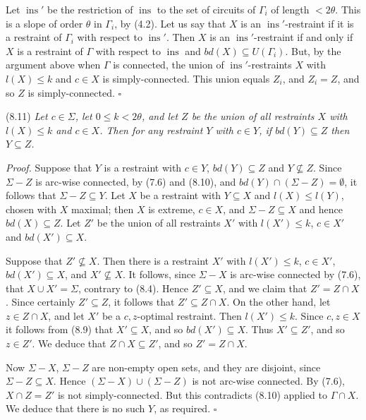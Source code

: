 Let $\operatorname{ins}'$ be the restriction of $\operatorname{ins}$ to the set of circuits of $\Gamma_i$ of length $<2\theta$. This is a slope of order $\theta$ in $\Gamma_i$, by (4.2). Let us say that $X$ is an $\operatorname{ins}'$-restraint if it is a restraint of $\Gamma_i$ with respect to $\operatorname{ins}'$. Then $X$ is an $\operatorname{ins}'$-restraint if and only if $X$ is a restraint of $\Gamma$ with respect to $\operatorname{ins}$ and $bd(X) \subseteq U(\Gamma_i)$. But, by the argument above when $\Gamma$ is connected, the union of $\operatorname{ins}'$-restraints $X$ with $l(X) \le k$ and $c \in X$ is simply-connected. This union equals $Z_i$, and $Z_i = Z$, and so $Z$ is simply-connected. $\square$

\stmt
(8.11) \textit{Let $c \in \Sigma$, let $0 \le k < 2\theta$, and let $Z$ be the union of all restraints $X$ with $l(X) \le k$ and $c \in X$. Then for any restraint $Y$ with $c \in Y$, if $bd(Y) \subseteq Z$ then $Y \subseteq Z$.}

\textit{Proof.} Suppose that $Y$ is a restraint with $c \in Y$, $bd(Y) \subseteq Z$ and $Y \nsubseteq Z$. Since $\Sigma - Z$ is arc-wise connected, by (7.6) and (8.10), and $bd(Y) \cap (\Sigma - Z) = \emptyset$, it follows that $\Sigma - Z \subseteq Y$. Let $X$ be a restraint with $Y \subseteq X$ and $l(X) \le l(Y)$, chosen with $X$ maximal; then $X$ is extreme, $c \in X$, and $\Sigma - Z \subseteq X$ and hence $bd(X) \subseteq Z$. Let $Z'$ be the union of all restraints $X'$ with $l(X') \le k$, $c \in X'$ and $bd(X') \subseteq X$.

Suppose that $Z' \nsubseteq X$. Then there is a restraint $X'$ with $l(X') \le k$, $c \in X'$, $bd(X') \subseteq X$, and $X' \nsubseteq X$. It follows, since $\Sigma - X$ is arc-wise connected by (7.6), that $X \cup X' = \Sigma$, contrary to (8.4). Hence $Z' \subseteq X$, and we claim that $Z' = Z \cap X$. Since certainly $Z' \subseteq Z$, it follows that $Z' \subseteq Z \cap X$. On the other hand, let $z \in Z \cap X$, and let $X'$ be a $c, z$-optimal restraint. Then $l(X') \le k$. Since $c, z \in X$ it follows from (8.9) that $X' \subseteq X$, and so $bd(X') \subseteq X$. Thus $X' \subseteq Z'$, and so $z \in Z'$. We deduce that $Z \cap X \subseteq Z'$, and so $Z' = Z \cap X$.

Now $\Sigma - X$, $\Sigma - Z$ are non-empty open sets, and they are disjoint, since $\Sigma - Z \subseteq X$. Hence $(\Sigma - X) \cup (\Sigma - Z)$ is not arc-wise connected. By (7.6), $X \cap Z = Z'$ is not simply-connected. But this contradicts (8.10) applied to $\Gamma \cap X$. We deduce that there is no such $Y$, as required. $\square$

